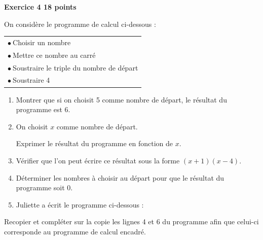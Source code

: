 \documentclass[11pt]{article}
\begin{document}
\bigskip

{\large \textbf{Exercice 4 \hfill 18 points}}

\medskip

On considère le programme de calcul ci-dessous :

\begin{center}
\begin{tabular}{|l|}\hline
$\bullet~$Choisir un nombre\\
$\bullet~$Mettre ce nombre au carré\\
$\bullet~$Soustraire le triple du nombre de départ\\
$\bullet~$Soustraire 4\\ \hline
\end{tabular}
\end{center}

\smallskip

\begin{enumerate}
\item Montrer que si on choisit 5 comme nombre de départ, le résultat du programme est 6.
\item On choisit $x$ comme nombre de départ.

Exprimer le résultat du programme en fonction de $x$.
\item Vérifier que l'on peut écrire ce résultat sous la forme $(x + 1)(x - 4)$.
\item Déterminer les nombres à choisir au départ pour que le résultat du programme soit 0.
\item Juliette a écrit le programme ci-dessous :

\begin{scratch}
\end{scratch}
\end{enumerate}

\medskip

Recopier et compléter sur la copie les lignes 4 et 6 du programme afin que celui-ci corresponde au programme de calcul encadré.
\end{document}
